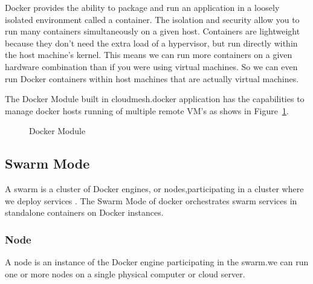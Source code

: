 \documentclass[9pt,twocolumn,twoside]{../../styles/osajnl}
\begin{document}
Docker provides the ability to package and run an application in a loosely isolated environment called a container. The isolation and security allow you to run many containers simultaneously on a given host. Containers are lightweight because they don’t need the extra load of a hypervisor, but run directly within the host machine’s kernel. This means we can run more containers on a given hardware combination than if you were using virtual machines. So we can even run Docker containers within host machines that are actually virtual machines.

The Docker Module built in cloudmesh.docker application has the capabilities to manage docker hosts running of multiple remote VM's as shows in Figure~\ref{fig:cmsdocker}. 

\begin{figure}[h!]
\centering
{}
\caption{Docker Module }
\label{fig:cmsdocker}
\end{figure}

\subsection{Swarm Mode}

A swarm\cite{www-Swarm} is a cluster of Docker engines, or nodes,participating in a cluster where we deploy services .
The Swarm Mode of docker orchestrates swarm services in standalone containers on Docker instances.

\subsubsection{Node}
A node is an instance of the Docker engine participating in the swarm.we can run one or more nodes on a single physical computer or cloud server.
\end{document}

